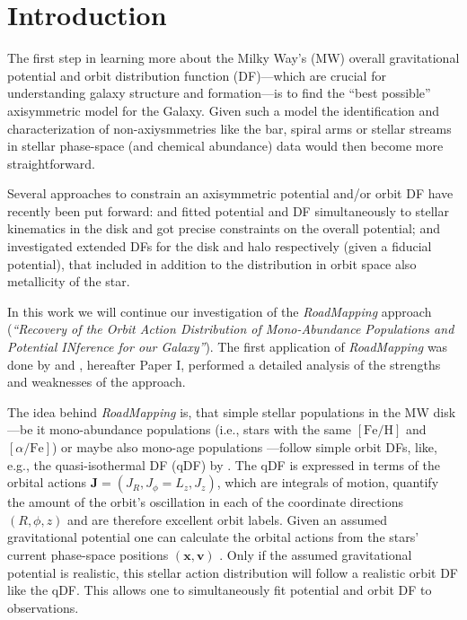 \documentclass[iop,revtex4,numberedappendix,appendixfloats]{emulateapj}
\newcommand{\vect}[1]{\boldsymbol{#1}}
\newcommand{\RM}{{\sl RoadMapping}}
\begin{document}
\section{Introduction}

The first step in learning more about the Milky Way's (MW) overall gravitational potential and orbit distribution function (DF)---which are crucial for understanding galaxy structure and formation---is to find the ``best possible'' axisymmetric model for the Galaxy. Given such a model the identification and characterization of non-axiysmmetries like the bar, spiral arms or stellar streams in stellar phase-space (and chemical abundance) data would then become more straightforward.

Several approaches to constrain an axisymmetric potential and/or orbit DF have recently been put forward: \citet{2013ApJ...779..115B} and \citet{2014MNRAS.445.3133P} fitted potential and DF simultaneously to stellar kinematics in the disk and got precise constraints on the overall potential; \citet{2015MNRAS.449.3479S} and \citet{2016MNRAS.460.1725D} investigated extended DFs for the disk and halo respectively (given a fiducial potential), that included in addition to the distribution in orbit space also metallicity of the star. 

In this work we will continue our investigation of the \RM{} approach (\emph{``Recovery of the Orbit Action Distribution of Mono-Abundance Populations and Potential INference for our Galaxy''}). The first application of \RM{} was done by \citet{2013ApJ...779..115B} and \citet{2016arXiv160508601T}, hereafter Paper I, performed a detailed analysis of the strengths and weaknesses of the approach. 

The idea behind \RM{} is, that simple stellar populations in the MW disk---be it mono-abundance populations \citep{2012ApJ...751..131B,2012ApJ...753..148B,2012ApJ...755..115B,2016ApJ...823...30B} (i.e., stars with the same $[\mathrm{Fe}/\mathrm{H}]$ and $[\alpha/\mathrm{Fe}]$) or maybe also mono-age populations \citep{2013ApJ...773...43B,2014MNRAS.442.2474M,2016MNRAS.456.3655M,2014A&A...572A..92M,2016ApJ...823..114N}---follow simple orbit DFs, like, e.g., the quasi-isothermal DF (qDF) by \citet{2011MNRAS.413.1889B} \citep{2013MNRAS.434..652T}. The qDF is expressed in terms of the orbital actions $\vect{J}=(J_R,J_\phi=L_z,J_z)$, which are integrals of motion, quantify the amount of the orbit's oscillation in each of the coordinate directions $(R,\phi,z)$ and are therefore excellent orbit labels. Given an assumed gravitational potential one can calculate the orbital actions from the stars' current phase-space positions $(\vect{x},\vect{v})$ \citep{2012MNRAS.426.1324B,2016MNRAS.457.2107S}. Only if the assumed gravitational potential is realistic, this stellar action distribution will follow a realistic orbit DF like the qDF. This allows one to simultaneously fit potential and orbit DF to observations.
\end{document}
